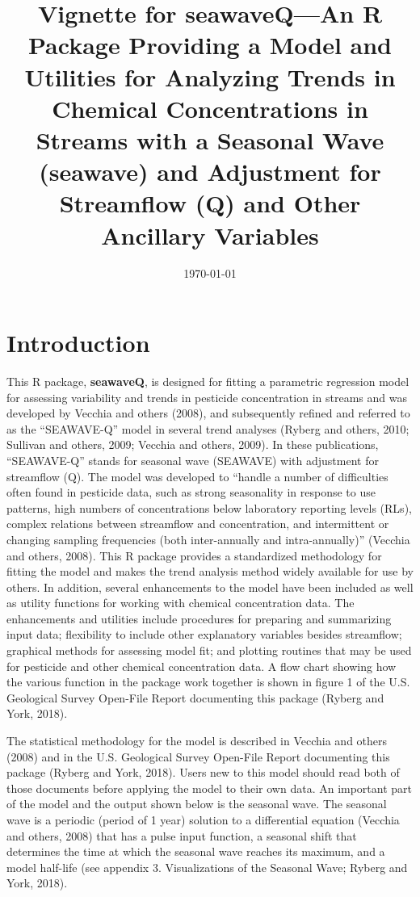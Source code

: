 \documentclass[11pt]{article}
\title{Vignette for seawaveQ---An R Package Providing a Model and Utilities for Analyzing Trends in Chemical Concentrations in Streams with a Seasonal Wave (seawave) and Adjustment for Streamflow (Q) and Other Ancillary Variables}
\date{\today}                                %
\begin{document}
\maketitle
\tableofcontents

\section{Introduction}

This R package, \textbf{seawaveQ}, is designed  for fitting a parametric regression model for assessing variability and trends in pesticide concentration in streams and was developed by Vecchia and others (2008), and subsequently refined and referred to as the ``SEAWAVE-Q'' model in several trend analyses (Ryberg and others, 2010; Sullivan and others, 2009; Vecchia and others, 2009).  In these publications, ``SEAWAVE-Q'' stands for seasonal wave (SEAWAVE) with adjustment for streamflow (Q).  The model was developed to ``handle a number of difficulties often found in pesticide data, such as strong seasonality in response to use patterns, high numbers of concentrations below laboratory reporting levels (RLs), complex relations between streamflow and concentration, and intermittent or changing sampling frequencies (both inter-annually and intra-annually)'' (Vecchia and others, 2008).  This R package provides a standardized methodology for fitting the model and makes the trend analysis method widely available for use by others. In addition, several enhancements to the model have been included as well as utility functions for working with chemical concentration data.  The enhancements and utilities include procedures for preparing and summarizing input data; flexibility to include other explanatory variables besides streamflow; graphical methods for assessing model fit; and plotting routines that may be used for pesticide and other chemical concentration data.  A flow chart showing how the various function in the package work together is shown in figure 1 of the U.S. Geological Survey Open-File Report documenting this package (Ryberg and York, 2018). 

The statistical methodology for the model is described in Vecchia and others (2008) and in the U.S. Geological Survey Open-File Report documenting this package (Ryberg and York, 2018).   Users new to this model should read both of those documents before applying the model to their own data.  An important part of the model and the output shown below is the seasonal wave. The seasonal wave is a periodic (period of 1 year) solution to a differential equation (Vecchia and others, 2008) that has a pulse input function, a seasonal shift that determines the time at which the seasonal wave reaches its maximum, and a model half-life (see appendix 3.  Visualizations of the Seasonal Wave; Ryberg and York, 2018).
\end{document}
